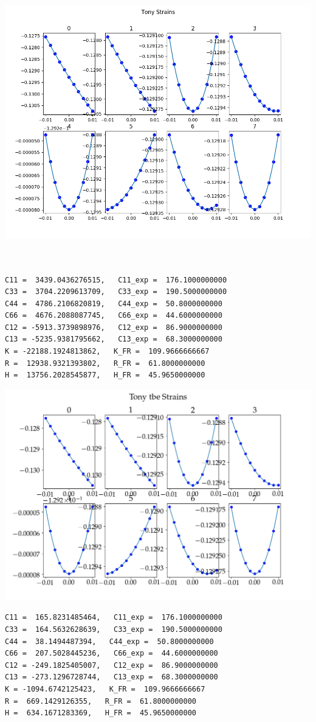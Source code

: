 \documentclass[11pt]{article}
\begin{document}
\begin{enumerate}
\begin{enumerate}
\begin{center}
\includegraphics[width=.9\linewidth]{Images/applied_tony_strains.png}
\end{center}
\begin{verbatim}


C11 =  3439.0436276515,   C11_exp =  176.1000000000
C33 =  3704.2209613709,   C33_exp =  190.5000000000
C44 =  4786.2106820819,   C44_exp =  50.8000000000
C66 =  4676.2088087745,   C66_exp =  44.6000000000
C12 = -5913.3739898976,   C12_exp =  86.9000000000
C13 = -5235.9381795662,   C13_exp =  68.3000000000
K = -22188.1924813862,   K_FR =  109.9666666667
R =  12938.9321393802,   R_FR =  61.8000000000
H =  13756.2028545877,   H_FR =  45.9650000000

\end{verbatim}
\begin{center}
\includegraphics[width=.9\linewidth]{Images/tonytbestrains.png}
\end{center}
\begin{verbatim}
C11 =  165.8231485464,   C11_exp =  176.1000000000
C33 =  164.5632628639,   C33_exp =  190.5000000000
C44 =  38.1494487394,   C44_exp =  50.8000000000
C66 =  207.5028445236,   C66_exp =  44.6000000000
C12 = -249.1825405007,   C12_exp =  86.9000000000
C13 = -273.1296728744,   C13_exp =  68.3000000000
K = -1094.6742125423,   K_FR =  109.9666666667
R =  669.1429126355,   R_FR =  61.8000000000
H =  634.1671283369,   H_FR =  45.9650000000 


\end{verbatim}
\end{enumerate}
\end{enumerate}
\end{document}
